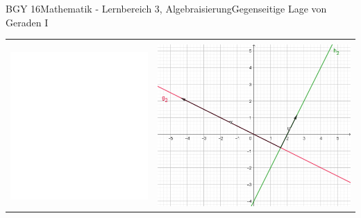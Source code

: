 \documentclass[oneside,openany,headings=optiontotoc,11pt,numbers=noenddot]{scrreprt}
\begin{document}
\begin{worksheet}{BGY 16}{Mathematik - Lernbereich 3, Algebraisierung}{Gegenseitige Lage von Geraden I}
\begin{framed}
\begin{center}
\begin{tabularx}{\textwidth}{Xr}
					\hline\\
					\includegraphics[scale=0.29]{../empty.jpg} & \includegraphics[scale=0.29]{Bilder/ghOrthogonal.jpg}
				\end{tabularx}
			\end{center}
		\end{framed}
	\end{worksheet}
\end{document}
